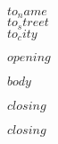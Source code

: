 \documentclass[11pt,a4paper]{dinbrief}
\begin{document}
\subject{\textbf{$subject$}}

\begin{letter}{
$to_name$ \\
$to_street$ \\[\medskipamount]
$to_city$}

\opening{$opening$}
\Datum{\today}

$body$



{
    \closing[{\texttt{[image: signature.pdf]}}]{$closing$}
}
{
    \closing[]{$closing$}
}

\end{letter}
\end{document}
